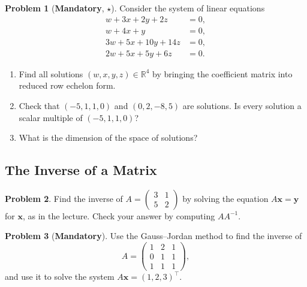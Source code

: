 \documentclass[11pt]{article}
\theoremstyle{definition}
\newtheorem{problem}{Problem}[section]
\newcommand{\mandatory}{\textcolor{red!70!black}{\textbf{Mandatory}}}
\begin{document}
\begin{problem}[\mandatory, $\star$]\label{pr:system}
    Consider the system of linear equations
    \begin{align*}
        w + 3x + 2y + 2z &= 0, \\
        w + 4x + y &= 0, \\
        3w + 5x + 10y + 14z &= 0, \\
        2w + 5x + 5y + 6z &= 0.
    \end{align*}
    \begin{enumerate}[label=(\alph*)]
        \item Find all solutions $(w, x, y, z) \in \mathbb{R}^4$ by bringing the coefficient matrix into reduced row echelon form.
        \item Check that $(-5, 1, 1, 0)$ and $(0, 2, -8, 5)$ are solutions. Is every solution a scalar multiple of $(-5, 1, 1, 0)$?
        \item What is the dimension of the space of solutions?
    \end{enumerate}
\end{problem}

\subsection{The Inverse of a Matrix}

\begin{problem}\label{pr:inverse2}
    Find the inverse of $A = \begin{pmatrix} 3 & 1 \\ 5 & 2 \end{pmatrix}$ by solving the equation $A\mathbf{x} = \mathbf{y}$ for $\mathbf{x}$, as in the lecture. Check your answer by computing $AA^{-1}$.
\end{problem}

\begin{problem}[\mandatory]\label{pr:inverse3}
    Use the Gauss--Jordan method to find the inverse of
    \[A = \begin{pmatrix} 1 & 2 & 1 \\ 0 & 1 & 1 \\ 1 & 1 & 1 \end{pmatrix},\]
    and use it to solve the system $A\mathbf{x} = (1, 2, 3)^\top$.
\end{problem}
\end{document}
